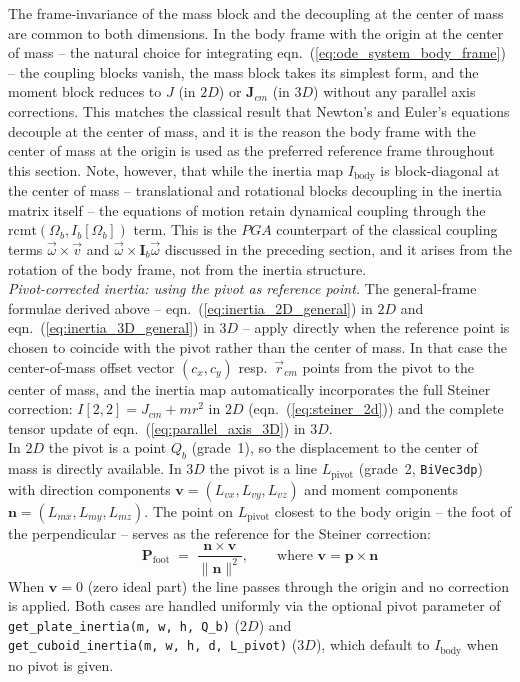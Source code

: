 The frame-invariance of the mass block and the decoupling at the center of mass are common
to both dimensions. In the body frame with the origin at the center of mass -- the natural
choice for integrating eqn.~(\ref{eq:ode_system_body_frame}) -- the coupling blocks
vanish, the mass block takes its simplest form, and the moment block reduces to $J$ (in
$2D$) or $\mathbf{J}_{cm}$ (in $3D$) without any parallel axis corrections. This matches
the classical result that Newton's and Euler's equations decouple at the center of mass,
and it is the reason the body frame with the center of mass at the origin is used as the
preferred reference frame throughout this section. Note, however, that while the inertia
map $I_\mathrm{body}$ is block-diagonal at the center of mass -- translational and
rotational blocks decoupling in the inertia matrix itself -- the equations of motion
retain dynamical coupling through the $\mathrm{rcmt}(\Omega_b, I_b[\Omega_b])$ term.
This is the $PGA$ counterpart of the classical coupling terms $\vec{\omega}\times\vec{v}$
and $\vec{\omega}\times\mathbf{I}_b\vec{\omega}$ discussed in the preceding section, and it
arises from the rotation of the body frame, not from the inertia structure. \\

\emph{Pivot-corrected inertia: using the pivot as reference point.}
The general-frame formulae derived above -- eqn.~(\ref{eq:inertia_2D_general}) in $2D$
and eqn.~(\ref{eq:inertia_3D_general}) in $3D$ -- apply directly when the reference point
is chosen to coincide with the pivot rather than the center of mass. In that case the
center-of-mass offset vector $(c_x, c_y)$ resp.\ $\vec{r}_{cm}$ points from the pivot to
the center of mass, and the inertia map automatically incorporates the full Steiner
correction: $I[2,2] = J_{cm} + mr^2$ in $2D$ (eqn.~(\ref{eq:steiner_2d})) and the
complete tensor update of eqn.~(\ref{eq:parallel_axis_3D}) in $3D$. \\

In $2D$ the pivot is a point $Q_b$ (grade~1), so the displacement to the center of mass
is directly available. In $3D$ the pivot is a line $L_\text{pivot}$ (grade~2,
\texttt{BiVec3dp}) with direction components $\mathbf{v} = (L_{vx}, L_{vy}, L_{vz})$ and
moment components $\mathbf{n} = (L_{mx}, L_{my}, L_{mz})$. The point on $L_\text{pivot}$
closest to the body origin -- the foot of the perpendicular -- serves as the reference
for the Steiner correction:
\begin{equation}
    \mathbf{P}_\text{foot} \;=\; \frac{\mathbf{n} \times \mathbf{v}}{\|\mathbf{n}\|^2},
    \qquad \text{where } \mathbf{v} = \mathbf{p} \times \mathbf{n}
    \label{eq:foot_of_perpendicular}
\end{equation}
When $\mathbf{v} = 0$ (zero ideal part) the line passes through the origin and no
correction is applied. Both cases are handled uniformly via the optional pivot parameter
of \texttt{get\_plate\_inertia(m, w, h, Q\_b)} ($2D$) and \\
\texttt{get\_cuboid\_inertia(m, w, h, d, L\_pivot)} ($3D$), which default to $I_\text{body}$
when no pivot is given. \\

